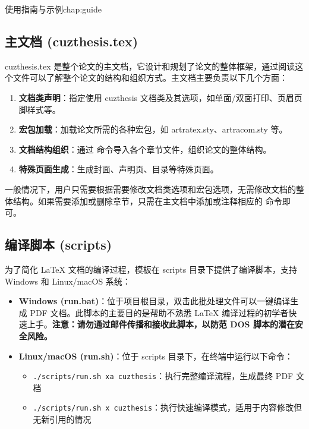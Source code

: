 \begin{cuzchapter}{使用指南与示例}{chap:guide}
    \subsection{主文档 (cuzthesis.tex)}\label{sub:cuzthesis}

    cuzthesis.tex 是整个论文的主文档，它设计和规划了论文的整体框架，通过阅读这个文件可以了解整个论文的结构和组织方式。主文档主要负责以下几个方面：

    \begin{enumerate}
        \item \textbf{文档类声明}：指定使用 cuzthesis 文档类及其选项，如单面/双面打印、页眉页脚样式等。
        \item \textbf{宏包加载}：加载论文所需的各种宏包，如 artratex.sty、artracom.sty 等。
        \item \textbf{文档结构组织}：通过 \verb|| 命令导入各个章节文件，组织论文的整体结构。
        \item \textbf{特殊页面生成}：生成封面、声明页、目录等特殊页面。
    \end{enumerate}

    一般情况下，用户只需要根据需要修改文档类选项和宏包选项，无需修改文档的整体结构。如果需要添加或删除章节，只需在主文档中添加或注释相应的 \verb|| 命令即可。

    \subsection{编译脚本 (scripts)}\label{sub:scripts}

    为了简化 LaTeX 文档的编译过程，模板在 scripts 目录下提供了编译脚本，支持 Windows 和 Linux/macOS 系统：

    \begin{itemize}
        \item \textbf{Windows (run.bat)}：位于项目根目录，双击此批处理文件可以一键编译生成 PDF 文档。此脚本的主要目的是帮助不熟悉 LaTeX 编译过程的初学者快速上手。\textbf{注意：请勿通过邮件传播和接收此脚本，以防范 DOS 脚本的潜在安全风险。}

        \item \textbf{Linux/macOS (run.sh)}：位于 scripts 目录下，在终端中运行以下命令：
              \begin{itemize}
                  \item \verb|./scripts/run.sh xa cuzthesis|：执行完整编译流程，生成最终 PDF 文档
                  \item \verb|./scripts/run.sh x cuzthesis|：执行快速编译模式，适用于内容修改但无新引用的情况
              \end{itemize}


\end{itemize}
\end{cuzchapter}

